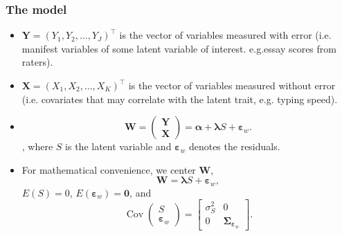\documentclass{beamer}
\newcommand{\mbf}[1]{\bm{#1}}
\newcommand{\bX}{\mbf{X}}
\newcommand{\bY}{\mbf{Y}}
\newcommand{\beps}{\mbf{\varepsilon}}
\newcommand{\blambda}{\mbf{\lambda}}
\newcommand{\bW}{\mbf{W}}
\newcommand{\bsigma}{\mbf{\Sigma}}
\DeclareMathOperator{\Cov}{Cov}
\begin{document}
	\begin{frame}[t]\frametitle{The model}
	\begin{itemize}
		\item $\bY = (Y_1, Y_2, \dots, Y_J)^\top$ is the vector of variables
		measured with error (i.e. manifest variables of some latent variable of
		interest. e.g.essay scores from raters).
  	\item $\bX = (X_1, X_2, \dots, X_K)^\top$ is the vector of variables
  	measured without error (i.e. covariates that may correlate with the latent
  	trait, e.g. typing speed).
  	\item \begin{equation}
				    \mbf{W} = \left (
				      \begin{array}{c} \bY \\  \bX \end{array} \right ) =
				    \mbf{\alpha} + \mbf{\lambda} S + \mbf{\varepsilon}_w.
				  \end{equation},
				  where $S$ is the latent variable and $\mbf{\varepsilon}_w$ denotes the
				  residuals.
		\item For mathematical convenience, we center $\bW$,
		\begin{equation}
		\label{eq:linear_model}
    	\bW = \blambda S + \mbf{\varepsilon}_w,
  	\end{equation}
  	$E(S) = 0$, $E(\beps_w) = \mbf{0}$, and
  	\begin{equation*}
	    \Cov\left(\begin{array}{c} S \\ \beps_w \end{array}\right) = \begin{bmatrix}
	      \sigma_S^2 & 0 \\
	      0 & \bsigma_{\beps_w}
	    \end{bmatrix}.
	  \end{equation*}
  \end{itemize}
	\end{frame}
\end{document}
